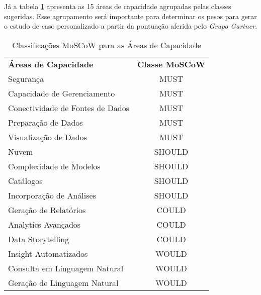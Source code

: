 Já a tabela \ref{tab:moscowordered} apresenta as 15 áreas de capacidade agrupadas pelas classes sugeridas. Esse agrupamento será importante para determinar os pesos para gerar o estudo de caso personalizado a partir da pontuação aferida pelo \emph{Grupo Gartner}.

\begin{table}[!h]
    \begin{center}
    \begin{tabular}{|p{}|c|}
        \hline
            \rowcolor{cldfB1} \multicolumn{2}{|c|}{\Large Classes MoSCoW \emph{Gartner} \normalsize} \\ \hline \hline
            \rowcolor{lightgray}\textbf{Áreas de Capacidade} & \textbf{Classe MoSCoW} \\ \hline
            \rowcolor{corMUST!80}Segurança & MUST \\ \hline
            \rowcolor{corMUST!80}Capacidade de Gerenciamento & MUST \\ \hline
            \rowcolor{corMUST!80}Conectividade de Fontes de Dados & MUST \\ \hline
            \rowcolor{corMUST!80}Preparação de Dados & MUST \\ \hline
            \rowcolor{corMUST!80}Visualização de Dados & MUST \\ \hline
            \rowcolor{corSHOULD!80}Nuvem & SHOULD \\ \hline
            \rowcolor{corSHOULD!80}Complexidade de Modelos & SHOULD \\ \hline
            \rowcolor{corSHOULD!80}Catálogos & SHOULD \\ \hline
            \rowcolor{corSHOULD!80}Incorporação de Análises & SHOULD \\ \hline
            \rowcolor{corCOULD!50}Geração de Relatórios & COULD \\ \hline
            \rowcolor{corCOULD!50}Analytics Avançados & COULD \\ \hline
            \rowcolor{corCOULD!50}Data Storytelling & COULD \\ \hline
            \rowcolor{corWOULD!50}Insight Automatizados & WOULD \\ \hline
            \rowcolor{corWOULD!50}Consulta em Linguagem Natural & WOULD \\ \hline
            \rowcolor{corWOULD!50}Geração de Linguagem Natural & WOULD \\ \hline
    \end{tabular}    
    \caption{\label{tab:moscowordered} Classificações MoSCoW para as Áreas de Capacidade}
    \end{center}
\end{table}

